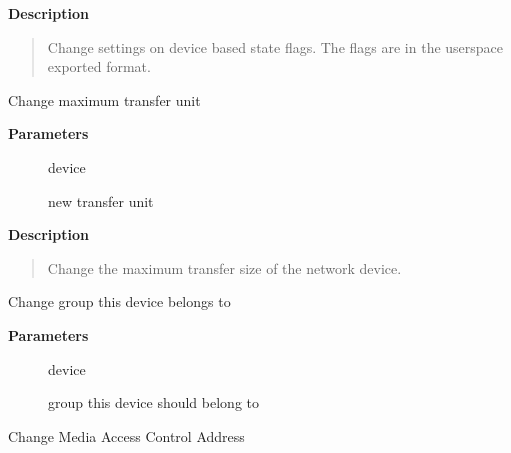 \documentclass[a4paper,8pt,english]{sphinxmanual}
\begin{document}
\textbf{Description}
\begin{quote}

Change settings on device based state flags. The flags are
in the userspace exported format.
\end{quote}

\begin{fulllineitems}
\label{networking/kapi:c.dev_set_mtu}
Change maximum transfer unit

\end{fulllineitems}


\textbf{Parameters}
\begin{description}
\item[{}] \leavevmode
device

\item[{}] \leavevmode
new transfer unit

\end{description}

\textbf{Description}
\begin{quote}

Change the maximum transfer size of the network device.
\end{quote}

\begin{fulllineitems}
\label{networking/kapi:c.dev_set_group}
Change group this device belongs to

\end{fulllineitems}


\textbf{Parameters}
\begin{description}
\item[{}] \leavevmode
device

\item[{}] \leavevmode
group this device should belong to

\end{description}

\begin{fulllineitems}
\label{networking/kapi:c.dev_set_mac_address}
Change Media Access Control Address

\end{fulllineitems}
\end{document}
